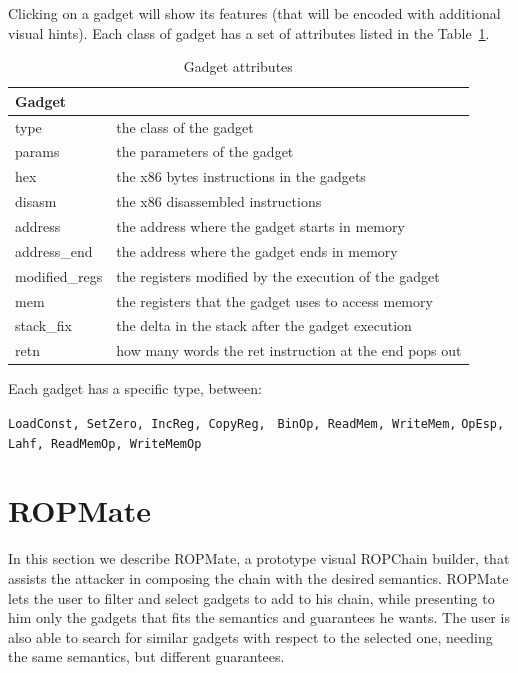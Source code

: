 \documentclass[twocolumn, 11pt]{article}
\begin{document}
Clicking on a gadget will show its features (that will be encoded with additional visual hints). Each class of gadget has a set of attributes listed in the Table~\ref{tab:gad_attr}.

\begin{table}[htb]
\caption{Gadget attributes}\label{tab:gad_attr}
\centering
  \begin{tabular}{|l|l|}
    \hline
    \textbf{Gadget} & \\ \hline
    type & the class of the gadget \\ \hline
    params & the parameters of the gadget \\ \hline
    hex & the x86 bytes instructions in the gadgets \\ \hline
    disasm & the x86 disassembled instructions \\ \hline
    address & the address where the gadget starts in memory \\ \hline
    address\_end & the address where the gadget ends in memory \\ \hline
    modified\_regs & the registers modified by the execution of the gadget \\ \hline
    mem & the registers that the gadget uses to access memory \\ \hline
    stack\_fix & the delta in the stack after the gadget execution \\ \hline
    retn & how many words the ret instruction at the end pops out \\ \hline
  \end{tabular}
\end{table}

\bigskip
Each gadget has a specific type, between:

\begin{center}
\noindent\texttt{LoadConst, SetZero, IncReg, CopyReg, }
\noindent\texttt{BinOp, ReadMem, WriteMem,}
\noindent\texttt{OpEsp, Lahf, ReadMemOp, WriteMemOp}
\end{center}

\section{ROPMate}
In this section we describe ROPMate, a prototype visual ROPChain builder, that assists the attacker in composing the chain with the desired semantics. ROPMate lets the user to filter and select gadgets to add to his chain, while presenting to him only the gadgets that fits the semantics and guarantees he wants. The user is also able to search for similar gadgets with respect to the selected one, needing the same semantics, but different guarantees.
\end{document}
